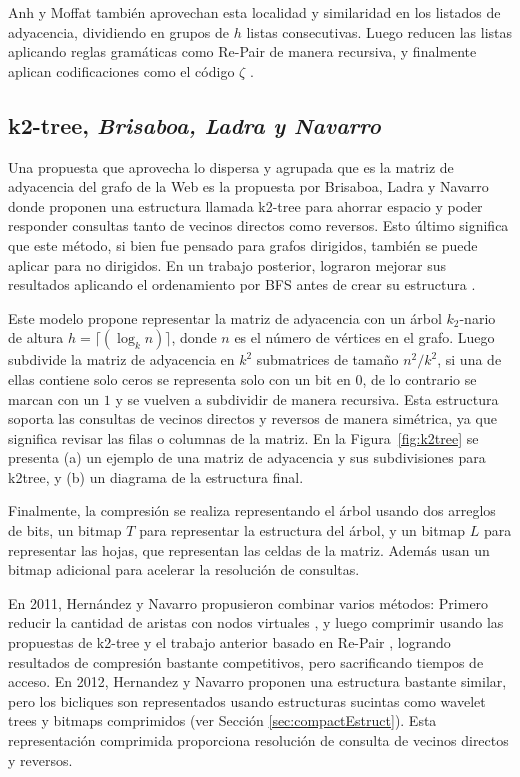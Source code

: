 Anh y Moffat \cite{anh2010local} también aprovechan esta localidad y similaridad en los listados de adyacencia, dividiendo en grupos de $h$ listas consecutivas. Luego reducen las listas aplicando reglas gramáticas como Re-Pair \cite{larsson2000off} de manera recursiva, y finalmente aplican codificaciones como el código $\zeta$ \cite{boldi2005codes}.


\subsection{k2-tree, \textit{Brisaboa, Ladra y Navarro}}
Una propuesta que aprovecha lo dispersa y agrupada que es la matriz de adyacencia del grafo de la Web es la propuesta por Brisaboa, Ladra y Navarro \cite{brisaboa2009k} donde proponen una estructura llamada k2-tree para ahorrar espacio y poder responder consultas tanto de vecinos directos como reversos. Esto último significa que este método, si bien fue pensado para grafos dirigidos, también se puede aplicar para no dirigidos. En un trabajo posterior, lograron mejorar sus resultados aplicando el ordenamiento por BFS antes de crear su estructura \cite{brisaboa2014compact}.

Este modelo propone representar la matriz de adyacencia con un árbol $k_{2}$-nario de altura $h=\lceil(\log_k n)\rceil$, donde $n$ es el número de vértices en el grafo. Luego subdivide la matriz de adyacencia en $k^2$ submatrices de tamaño $n^{2}/k^{2}$, si una de ellas contiene solo ceros se representa solo con un bit en $0$, de lo contrario se marcan con un $1$ y se vuelven a subdividir de manera recursiva. Esta estructura soporta las consultas de vecinos directos y reversos de manera simétrica, ya que significa revisar las filas o columnas de la matriz. En la Figura~\ref{fig:k2tree} se presenta (a) un ejemplo de una matriz de adyacencia y sus subdivisiones para k2tree, y (b) un diagrama de la estructura final.



Finalmente, la compresión se realiza representando el árbol usando dos arreglos de bits, un bitmap $T$ para representar la estructura del árbol, y un bitmap $L$ para representar las hojas, que representan las celdas de la matriz. Además usan un bitmap adicional para acelerar la resolución de consultas. 

En 2011, Hernández y Navarro \cite{hernandez2011compression} propusieron combinar varios métodos: Primero reducir la cantidad de aristas con nodos virtuales \cite{BuehrerChellapilla},  y luego comprimir usando las propuestas de k2-tree \cite{brisaboa2009k} y el trabajo anterior basado en Re-Pair \cite{claude2010fast}, logrando resultados de compresión bastante competitivos, pero sacrificando tiempos de acceso. En 2012, Hernandez y Navarro \cite{hernandez2012compressed} proponen una estructura bastante similar, pero los bicliques son representados usando estructuras sucintas como wavelet trees y bitmaps comprimidos (ver Sección \ref{sec:compactEstruct}). Esta representación comprimida proporciona resolución de consulta de vecinos directos y reversos.

